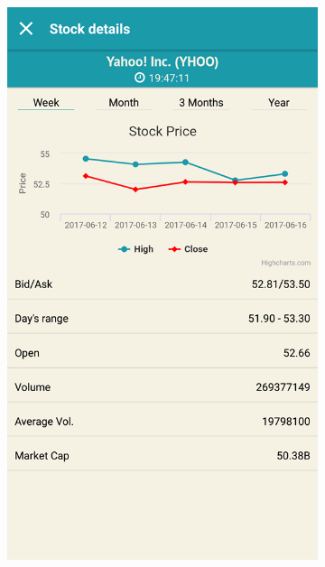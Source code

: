 \documentclass[a4paper,12pt,fleqn]{article}
\begin{document}
\begin{appendices}
\begin{figure}[t!]
\begin{subfigure}{0.5\textwidth}
		\includegraphics[width=0.7\linewidth]{stockDetails.png}
		\label{app:priedas8}
	\end{subfigure}%
\end{figure}

\end{appendices}
\end{document}
